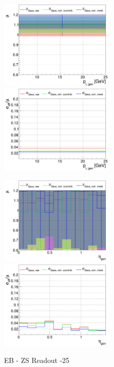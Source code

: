 \begin{figure}
\includegraphics[width=0.495\textwidth]{./plots_pdf/ECAL_plots/plotsNOPU/EB/ZS/pdf/GENPT/EBZS_GENPT_0006_0025_MuOverBins.pdf}
\includegraphics[width=0.495\textwidth]{./plots_pdf/ECAL_plots/plotsNOPU/EB/ZS/pdf/GENPT/EBZS_GENPT_0006_0025_EffSigmaOverBins.pdf}

\includegraphics[width=0.495\textwidth]{./plots_pdf/ECAL_plots/plotsNOPU/EB/ZS/pdf/GENETA/EBZS_GENETA_0006_0025_MuOverBins.pdf}
\includegraphics[width=0.495\textwidth]{./plots_pdf/ECAL_plots/plotsNOPU/EB/ZS/pdf/GENETA/EBZS_GENETA_0006_0025_EffSigmaOverBins.pdf}
\caption[]{EB - ZS Readout -25}
\end{figure}




